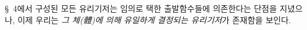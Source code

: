 
\S\ 4에서 구성된 모든 유리기저는 임의로 택한 출발함수들에 의존한다는 단점을 지녔으나, 이제 우리는 \emph{그 체(體)에 의해 유일하게 결정되는 유리기저}가 존재함을 보인다.
